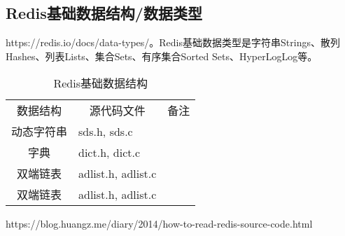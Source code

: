 \documentclass[../../../interview-questions.tex]{subfiles}
\begin{document}
\subsection{Redis基础数据结构/数据类型}

https://redis.io/docs/data-types/。Redis基础数据类型是字符串Strings、散列Hashes、列表Lists、集合Sets、有序集合Sorted Sets、HyperLogLog等。

\begin{table}[htbp]
	\caption{Redis基础数据结构}
	\label{table:redisdatastructure}
	\begin{center}
		\begin{tabular}{cp{4cm}c}
			\hline
			\multirow{1}{*}{数据结构}
			& \multicolumn{1}{c}{源代码文件} 
			& \multicolumn{1}{c}{备注}\\			
			\cline{1-3}
			动态字符串 & sds.h, sds.c  &   \\
			\hline
			字典 & dict.h, dict.c &  \\
			\hline
			双端链表 & adlist.h, adlist.c &  \\
			\hline
            双端链表 &  adlist.h, adlist.c &  \\
			\hline							
		\end{tabular}	
	\end{center}
\end{table}

https://blog.huangz.me/diary/2014/how-to-read-redis-source-code.html
\end{document}
